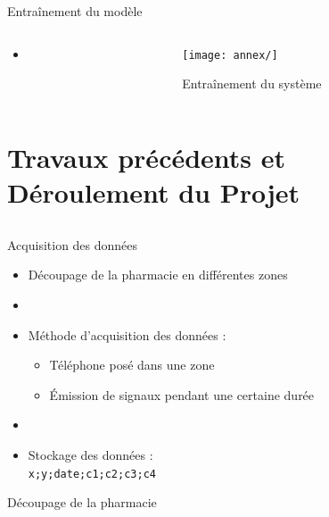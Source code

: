 \documentclass{beamer}
\begin{document}
\begin{frame}[t]{Entraînement du modèle}
  \begin{columns}
  \begin{column}[T]{0.5\textwidth}
    \begin{itemize}
      \item
    \end{itemize}
  \end{column}
  \hfill
  \begin{column}[T]{0.5\textwidth}
    \begin{figure}
      \texttt{[image: annex/]}
      \caption{Entraînement du système}
      \label{entrainement}
    \end{figure}
  \end{column}
  \end{columns}
\end{frame}

\section[Travaux précédents -- Déroulement]{Travaux précédents et Déroulement du Projet}

\subsection*{}

\begin{frame}{Acquisition des données}
  \begin{itemize}
    \item Découpage de la pharmacie en différentes zones
    \item[]
    \item Méthode d'acquisition des données :
    \begin{itemize}
      \item Téléphone posé dans une zone
      \item \'Emission de signaux pendant une certaine durée
    \end{itemize}
    \item[]
    \item Stockage des données :\\
    \texttt{x;y;date;c1;c2;c3;c4}
  \end{itemize}
\end{frame}

\begin{frame}{Découpage de la pharmacie}
  \begin{center}
  \end{center}
\end{frame}
\end{document}
